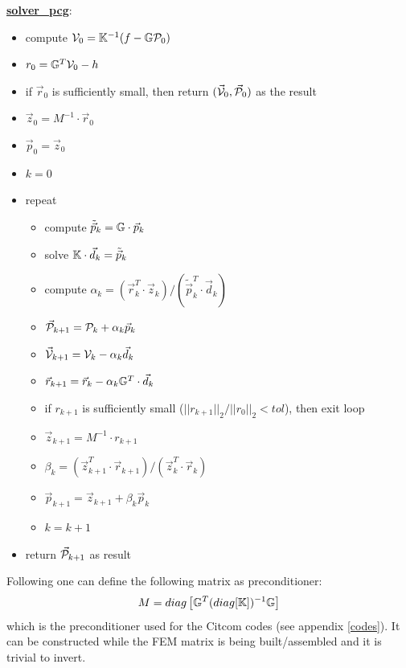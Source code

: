 \begin{mdframed}[backgroundcolor=blue!5]
\underline{\bf solver\_pcg}:
\begin{itemize}
\item compute ${\cal V}_0={\mathbb{K}}^{-1}(f-{\mathbb{G}}{\cal P}_0)$
\item $r_0 = {\mathbb{G}}^T {\cal V}_0 - h$
\item if $\vec{r}_0$ is sufficiently small, then return $(\vec{\cal V}_0,\vec{\cal P}_0)$ as the result
\item $\vec{z}_0= M^{-1} \cdot \vec{r}_0$ 
\item $\vec{p}_0=\vec{z}_0$
\item $k=0$
\item repeat
\begin{itemize}
\item compute $\tilde{\vec{p}}_k = {\mathbb{G}} \cdot \vec{p}_k$
\item solve ${\mathbb{K}}\cdot  \vec{d}_k = \tilde{\vec{p}}_k$
\item compute $\alpha_k=(\vec{r}_k^T \cdot \vec{z}_k)/(\tilde{\vec{p}}_k^T \cdot \vec{d}_k)$
\item $\vec{\cal P}_{k+1} = {\cal P}_k+\alpha_k \vec{p}_k$
\item $\vec{\cal V}_{k+1} = {\cal V}_k - \alpha_k \vec{d}_k$
\item $\vec{r}_{k+1} = \vec{r}_k - \alpha_k {\mathbb{G}}^T \cdot \vec{d}_k $
\item if $r_{k+1}$ is sufficiently small ($||r_{k+1}||_2/||r_0||_2 <tol$), then exit loop
\item $\vec{z}_{k+1}=M^{-1} \cdot r_{k+1}$
\item $\beta_k=(\vec{z}_{k+1}^T \cdot  \vec{r}_{k+1})/(\vec{z}_k^T \cdot  \vec{r}_k)$
\item $\vec{p}_{k+1} =\vec{z}_{k+1}+ \beta_k \vec{p}_k$
\item $k=k+1$
\end{itemize}
\item return $\vec{\cal P}_{k+1}$ as result
\end{itemize}
\end{mdframed}

Following \cite{zhym12} one can define the following matrix as preconditioner:
\[
M = diag \left[ {\mathbb{G}}^T (diag [{\mathbb{K}}]  )^{-1} {\mathbb{G}} \right]
\]
which is the preconditioner used for the Citcom codes (see appendix \ref{codes}). It 
can be constructed while the FEM matrix is being built/assembled
and it is trivial to invert.
















